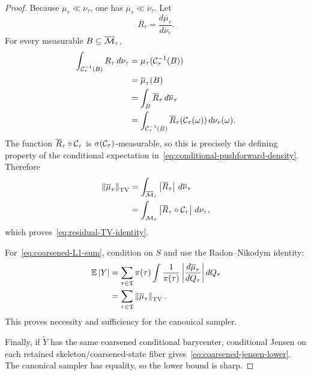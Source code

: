 \begin{proof}
Because $\mu_\tau\ll\nu_\tau$, one has $\overline\mu_\tau\ll\overline\nu_\tau$. Let
\begin{equation*}
  \overline R_\tau
  =
  \frac{d\overline\mu_\tau}{d\overline\nu_\tau}.
\end{equation*}
For every measurable $B\subseteq\overline{\mathcal M}_\tau$,
\begin{align*}
  \int_{\mathcal C_\tau^{-1}(B)}R_\tau\,d\nu_\tau
  &=
  \mu_\tau(\mathcal C_\tau^{-1}(B))\\
  &=
  \overline\mu_\tau(B)\\
  &=
  \int_B\overline R_\tau\,d\overline\nu_\tau\\
  &=
  \int_{\mathcal C_\tau^{-1}(B)}
  \overline R_\tau(\mathcal C_\tau(\omega))
  \,d\nu_\tau(\omega).
\end{align*}
The function $\overline R_\tau\circ\mathcal C_\tau$ is $\sigma(\mathcal C_\tau)$-measurable, so this is precisely the defining property of the conditional expectation in~\eqref{eq:conditional-pushforward-density}. Therefore
\begin{align*}
  \left\lVert\overline\mu_\tau\right\rVert_{\mathrm{TV}}
  &=
  \int_{\overline{\mathcal M}_\tau}
  \left|\overline R_\tau\right|
  \,d\overline\nu_\tau\\
  &=
  \int_{\mathcal M_\tau}
  \left|\overline R_\tau\circ\mathcal C_\tau\right|
  \,d\nu_\tau,
\end{align*}
which proves~\eqref{eq:residual-TV-identity}.

For~\eqref{eq:coarsened-L1-sum}, condition on $S$ and use the Radon--Nikodym identity:
\begin{align*}
  \mathbb E\left|Y\right|
  &=
  \sum_{\tau\in\mathfrak T}
  \pi(\tau)
  \int
  \frac1{\pi(\tau)}
  \left|\frac{d\overline\mu_\tau}{dQ_\tau}\right|
  dQ_\tau\\
  &=
  \sum_{\tau\in\mathfrak T}
  \left\lVert\overline\mu_\tau\right\rVert_{\mathrm{TV}}.
\end{align*}
This proves necessity and sufficiency for the canonical sampler.

Finally, if $\widetilde Y$ has the same coarsened conditional barycenter, conditional Jensen on each retained skeleton/coarsened-state fiber gives~\eqref{eq:coarsened-jensen-lower}. The canonical sampler has equality, so the lower bound is sharp.
\end{proof}

